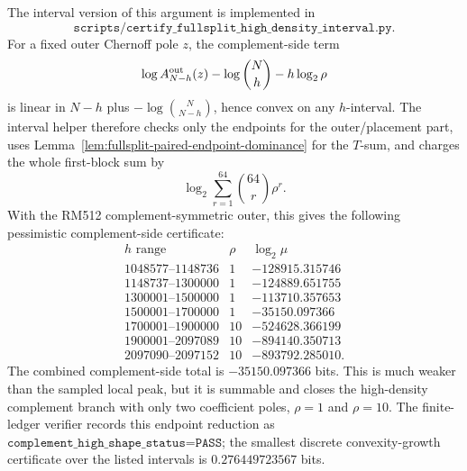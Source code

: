 The interval version of this argument is implemented in
\[
\texttt{scripts/certify\_fullsplit\_high\_density\_interval.py}.
\]
For a fixed outer Chernoff pole \(z\), the complement-side term
\[
\log A_{N-h}^{\rm out}(z)-\log\binom Nh-h\log_2\rho
\]
is linear in \(N-h\) plus \(-\log\binom{N}{N-h}\), hence convex on any \(h\)-interval.  The interval helper therefore
checks only the endpoints for the outer/placement part, uses Lemma~\ref{lem:fullsplit-paired-endpoint-dominance} for
the \(T\)-sum, and charges the whole first-block sum by
\[
\log_2\sum_{r=1}^{64}\binom{64}{r}\rho^r .
\]
With the RM512 complement-symmetric outer, this gives the following pessimistic complement-side certificate:
\[
\begin{array}{c|c|c}
h\text{ range} & \rho & \log_2\mu\\
\hline
1048577\text{--}1148736 & 1 & -128915.315746\\
1148737\text{--}1300000 & 1 & -124889.651755\\
1300001\text{--}1500000 & 1 & -113710.357653\\
1500001\text{--}1700000 & 1 & -35150.097366\\
1700001\text{--}1900000 & 10 & -524628.366199\\
1900001\text{--}2097089 & 10 & -894140.350713\\
2097090\text{--}2097152 & 10 & -893792.285010 .
\end{array}
\]
The combined complement-side total is \(-35150.097366\) bits.  This is much weaker than the sampled local peak, but it
is summable and closes the high-density complement branch with only two coefficient poles, \(\rho=1\) and \(\rho=10\).
The finite-ledger verifier records this endpoint reduction as
\(\texttt{complement\_high\_shape\_status=PASS}\); the smallest discrete convexity-growth certificate over the listed
intervals is \(0.276449723567\) bits.

